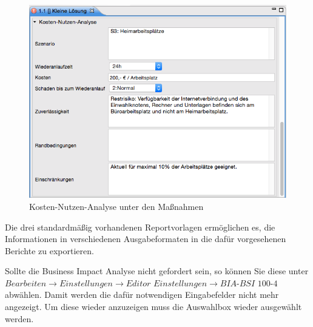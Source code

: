 \documentclass[a4paper,10pt]{book}
\begin{document}
\begin{figure}[htb!]
  \centering
  \includegraphics[width=\linewidth]{Screenshot/kosten-nutzen-analyse-unter-den-massnahmen.png}
  \caption{Kosten-Nutzen-Analyse unter den Maßnahmen}
  \label{fig:kosten-nutzen-analyse-unter-den-massnahmen}
\end{figure}

Die drei standardmäßig vorhandenen Reportvorlagen ermöglichen es, die
Informationen in verschiedenen Ausgabeformaten in die dafür vorgesehenen
Berichte zu exportieren.

Sollte die Business Impact Analyse nicht gefordert sein, so können Sie diese
unter $\textit{Bearbeiten}\to\textit{Einstellungen}\to\textit{Editor
Einstellungen}\to\textit{BIA-BSI 100-4}$ abwählen. Damit werden die dafür
notwendigen Eingabefelder nicht mehr angezeigt. Um diese wieder anzuzeigen muss
die Auswahlbox wieder ausgewählt werden.
\end{document}
